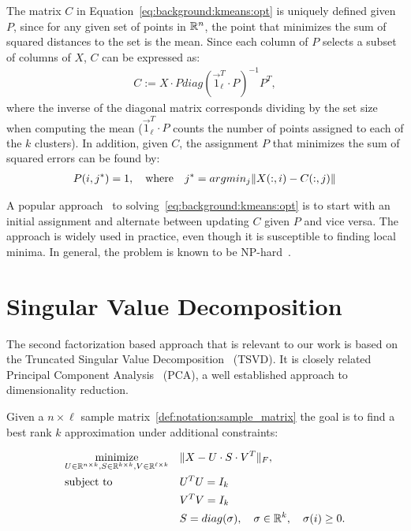 The matrix $C$ in Equation~\ref{eq:background:kmeans:opt} is uniquely defined given $P$, since for any given set
of points in $\mathbb{R}^n$, the point that minimizes the sum of squared distances to the set is the mean. Since each
column of $P$ selects a subset of columns of $X$, $C$ can be expressed as:
\begin{equation}\label{eq:background:kmeans:centroids}
\begin{aligned}
 C := X\cdot P diag(\vec{1}_\ell^T \cdot P)^{-1} P^T,
\end{aligned}
\end{equation}
where the inverse of the diagonal matrix corresponds dividing by the set size when computing the mean ($\vec{1}_\ell^T \cdot P$ counts
the number of points assigned to each of the $k$ clusters). In addition, given $C$, the assignment $P$ that
minimizes the sum of squared errors can be found by:
\begin{equation}\label{eq:background:kmeans:assignments}
\begin{aligned}
P(i, j^*) = 1,\quad \textnormal{where}\quad j^* = argmin_j \lVert X(:,i) - C(:,j)\rVert
\end{aligned}
\end{equation}

A popular approach~\cite{kmeans} to solving~\ref{eq:background:kmeans:opt} is to start with an initial assignment and alternate between updating $C$ given $P$ and vice
versa. The approach is widely used in practice, even though it is susceptible to finding local minima. In general, the problem is known to be NP-hard~\cite{aloise2009np}.

\section{Singular Value Decomposition}\label{chap:background:svd}

The second factorization based approach that is relevant to our work is based on the Truncated Singular Value Decomposition~\cite{golub} (TSVD). It is closely
related Principal Component Analysis~\cite{Pearson1901On} (PCA), a well established approach to dimensionality reduction.

Given a $n \times \ell$ sample matrix~\ref{def:notation:sample_matrix}
the goal is to find a best rank $k$ approximation under additional constraints:

\begin{equation}\label{eq:background:svd:opt}
\begin{aligned}
& \underset{U \in \mathbb{R}^{n \times k}, S \in \mathbb{R}^{k \times k}, V \in \mathbb{R}^{\ell \times k}}{\text{minimize}}
& & \lVert X - U \cdot S \cdot V^T\rVert_F, \\
& \text{subject to}
& & U^TU = I_k \\
& & & V^TV = I_k \\
& & & S = diag(\sigma), \quad \sigma \in \mathbb{R}^k, \quad \sigma(i) \geq 0.
\end{aligned}
\end{equation}

